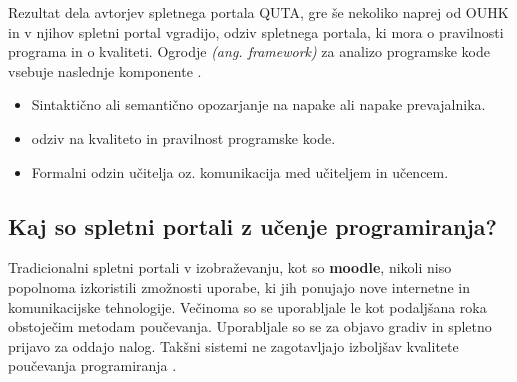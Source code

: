 Rezultat dela avtorjev spletnega portala QUTA, gre še nekoliko naprej
od OUHK in v njihov spletni portal vgradijo, odziv spletnega portala,
ki mora o pravilnosti programa in o kvaliteti. Ogrodje
\emph{(ang. framework)} za analizo programske kode vsebuje naslednje
komponente \cite{thesisAWebP}.

\begin{itemize}
\tightlist
\item
  Sintaktično ali semantično opozarjanje na napake ali napake
  prevajalnika.
\item
  odziv na kvaliteto in pravilnost programske kode.
\item
  Formalni odzin učitelja oz. komunikacija med učiteljem in učencem.
\end{itemize}

\subsection{Kaj so spletni portali z učenje programiranja? }
\label{sec:Problematika_začetkov_učenja_programiranja}




Tradicionalni spletni portali v izobraževanju, kot so \textbf{moodle},
nikoli niso popolnoma izkoristili zmožnosti uporabe, ki jih ponujajo
nove internetne in komunikacijske tehnologije. Večinoma so se
uporabljale le kot podaljšana roka obstoječim metodam
poučevanja. Uporabljale so se za objavo gradiv in spletno prijavo za
oddajo nalog. Takšni sistemi ne zagotavljajo izboljšav kvalitete
poučevanja programiranja \cite{ITaLCP_DistanceEdu}.

